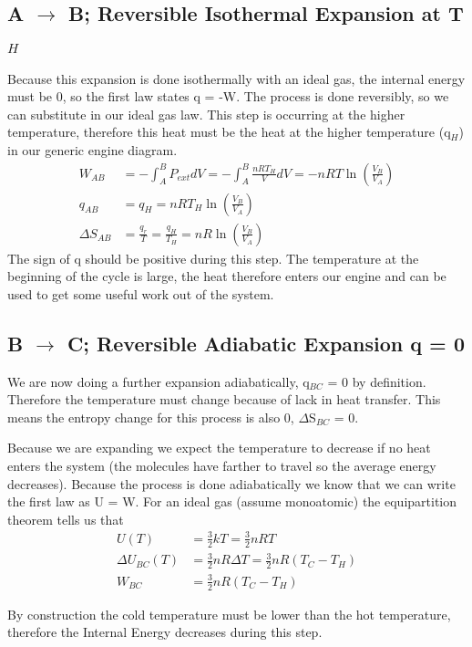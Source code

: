 \documentclass{article}
\newcommand{\be}{\begin{equation}}
\newcommand{\ee}{\end{equation}}
\begin{document}
\subsection*{A $\rightarrow$ B; Reversible Isothermal Expansion at T$_H$}
Because this expansion is done isothermally with an ideal gas, the internal energy must be 0, so the first law states q = -W. 
The process is done reversibly, so we can substitute in our ideal gas law.
This step is occurring at the higher temperature, therefore this heat must be the heat at the higher temperature (q$_H$) in our generic engine diagram. 
\be
\begin{split}
W_{AB} &= -\int_A^B P_{ext}dV = -\int_A^B \frac{nRT_H}{V}dV = -nRT\ln\left(\frac{V_B}{V_A}\right) \\
q_{AB} &= q_H = nRT_H\ln\left(\frac{V_B}{V_A}\right) \\
\Delta S_{AB} &= \frac{q_{r}}{T} = \frac{q_H}{T_H} = nR\ln\left(\frac{V_B}{V_A}\right)
\end{split}
\ee
The sign of q should be positive during this step. The temperature at the beginning of the cycle is large, the heat therefore enters our engine and can be used to get some useful work out of the system. 

\subsection*{B $\rightarrow$ C; Reversible Adiabatic Expansion q = 0}
We are now doing a further expansion adiabatically, q$_{BC}$ = 0 by definition.
Therefore the temperature must change because of lack in heat transfer.  
This means the entropy change for this process is also 0, $\Delta$S$_{BC}$ = 0.

Because we are expanding we expect the temperature to decrease if no heat enters the system (the molecules have farther to travel so the average energy decreases). 
Because the process is done adiabatically we know that we can write the first law as U = W.
For an ideal gas (assume monoatomic) the equipartition theorem tells us that
\be
\begin{split}
    U(T) &= \frac{3}{2}kT = \frac{3}{2}nRT \\
    \Delta U_{BC}(T) &= \frac{3}{2}nR\Delta T = \frac{3}{2}nR(T_C-T_H)  \\
    W_{BC} &= \frac{3}{2}nR(T_C-T_H) 
\end{split}
\ee

By construction the cold temperature must be lower than the hot temperature, therefore the Internal Energy decreases during this step. 
\end{document}
